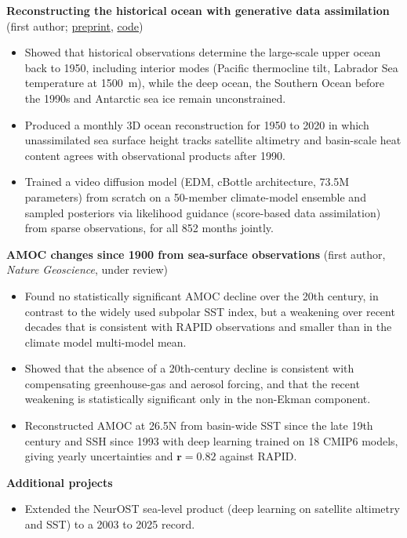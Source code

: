 \documentclass[letterpaper,10pt]{article}
\begin{document}
\textbf{Reconstructing the historical ocean with generative data assimilation} (first author; \href{https://doi.org/10.22541/essoar.15011822/v1}{preprint}, \href{https://github.com/mdvdvandrei/GenDA-historical-3d-ocean-reconstruction}{code})
\begin{itemize}
    \item Showed that historical observations determine the large-scale upper ocean back to 1950, including interior modes (Pacific thermocline tilt, Labrador Sea temperature at 1500~m), while the deep ocean, the Southern Ocean before the 1990s and Antarctic sea ice remain unconstrained.
    \item Produced a monthly 3D ocean reconstruction for 1950 to 2020 in which unassimilated sea surface height tracks satellite altimetry and basin-scale heat content agrees with observational products after 1990.
    \item Trained a video diffusion model (EDM, cBottle architecture, 73.5M parameters) from scratch on a 50-member climate-model ensemble and sampled posteriors via likelihood guidance (score-based data assimilation) from sparse observations, for all 852 months jointly.
\end{itemize}

\textbf{AMOC changes since 1900 from sea-surface observations} (first author, \textit{Nature Geoscience}, under review)
\begin{itemize}
    \item Found no statistically significant AMOC decline over the 20th century, in contrast to the widely used subpolar SST index, but a weakening over recent decades that is consistent with RAPID observations and smaller than in the climate model multi-model mean.
    \item Showed that the absence of a 20th-century decline is consistent with compensating greenhouse-gas and aerosol forcing, and that the recent weakening is statistically significant only in the non-Ekman component.
    \item Reconstructed AMOC at 26.5\textdegree N from basin-wide SST since the late 19th century and SSH since 1993 with deep learning trained on 18 CMIP6 models, giving yearly uncertainties and $\mathbf{r = 0.82}$ against RAPID.
\end{itemize}

\textbf{Additional projects}
\begin{itemize}
    \item Extended the NeurOST sea-level product (deep learning on satellite altimetry and SST) to a 2003 to 2025 record.
\end{itemize}
\end{document}
